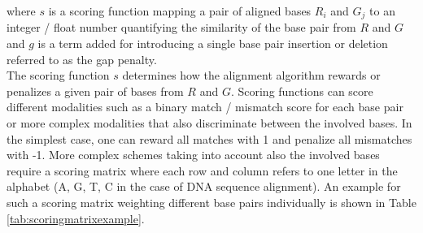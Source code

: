 where $s$ is a scoring function mapping a pair of aligned bases $R_i$ and $G_j$  to an integer / float number quantifying the similarity of the base pair from $R$ and $G$ and $g$ is a term added for introducing a single base pair insertion or deletion referred to as the gap penalty. \\
The scoring function $s$ determines how the alignment algorithm rewards or penalizes a given pair of bases from $R$ and $G$. Scoring functions can score different modalities such as a binary match / mismatch score for each base pair or more complex modalities that also discriminate between the involved bases. In the simplest case, one can reward all matches with 1 and penalize all mismatches with -1. More complex schemes taking into account also the involved bases require a scoring matrix where each row and column refers to one letter in the alphabet (A, G, T, C in the case of DNA sequence alignment). An example for such a scoring matrix weighting different base pairs individually is shown in Table \ref{tab:scoringmatrixexample}.

\begin{table}[!ht]
\begin{center}
\begin{footnotesize}
\noindent{}
\end{footnotesize}
\end{center}
\caption[Example scoring matrix]{\textbf{Example scoring matrix.} Each base pairing receives an individual score, so matches and mismatches are weighed differently depending on what bases are matched or mismatched.}
\label{tab:scoringmatrixexample}
\end{table}

